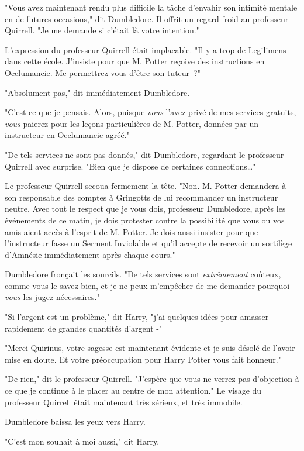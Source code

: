 "Vous avez maintenant rendu plus difficile la tâche d'envahir son intimité mentale en de futures occasions," dit Dumbledore. Il offrit un regard froid au professeur Quirrell. "Je me demande si c'était là votre intention."

L'expression du professeur Quirrell était implacable. "Il y a trop de Legilimens dans cette école. J'insiste pour que M. Potter reçoive des instructions en Occlumancie. Me permettrez-vous d'être son tuteur~?"

"Absolument pas," dit immédiatement Dumbledore.

"C'est ce que je pensais. Alors, puisque \emph{vous} l'avez privé de mes services gratuits, \emph{vous} paierez pour les leçons particulières de M. Potter, données par un instructeur en Occlumancie agréé."

"De tels services ne sont pas donnés," dit Dumbledore, regardant le professeur Quirrell avec surprise. "Bien que je dispose de certaines connections…"

Le professeur Quirrell secoua fermement la tête. "Non. M. Potter demandera à son responsable des comptes à Gringotts de lui recommander un instructeur neutre. Avec tout le respect que je vous dois, professeur Dumbledore, après les événements de ce matin, je dois protester contre la possibilité que vous ou vos amis aient accès à l'esprit de M. Potter. Je dois aussi insister pour que l'instructeur fasse un Serment Inviolable et qu'il accepte de recevoir un sortilège d'Amnésie immédiatement après chaque cours."

Dumbledore fronçait les sourcils. "De tels services sont \emph{extrêmement} coûteux, comme vous le savez bien, et je ne peux m'empêcher de me demander pourquoi \emph{vous} les jugez nécessaires."

"Si l'argent est un problème," dit Harry, "j'ai quelques idées pour amasser rapidement de grandes quantités d'argent -"

"Merci Quirinus, votre sagesse est maintenant évidente et je suis désolé de l'avoir mise en doute. Et votre préoccupation pour Harry Potter vous fait honneur."

"De rien," dit le professeur Quirrell. "J'espère que vous ne verrez pas d'objection à ce que je continue à le placer au centre de mon attention." Le visage du professeur Quirrell était maintenant très sérieux, et très immobile.

Dumbledore baissa les yeux vers Harry.

"C'est mon souhait à moi aussi," dit Harry.

